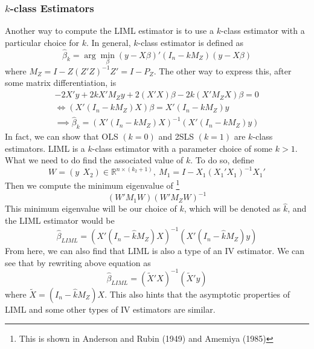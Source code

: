 \documentclass[12pt]{article}
\theoremstyle{definition}
\theoremstyle{property}
\theoremstyle{assumption}
\theoremstyle{example}
\theoremstyle{comment}
\begin{document}
\subsubsection{$k$-class Estimators}
Another way to compute the LIML estimator is to use a $k$-class estimator with a particular choice for $k$. In general, $k$-class estimator is defined as 
\[
\hat{\beta}_k=\arg\min_\beta(y-X\beta)'(I_n-kM_Z)(y-X\beta)
\]
where $M_Z = I-Z(Z'Z)^{-1}Z'=I-P_Z$. The other way to express this, after some matrix differentiation, is 
\begin{gather*}
-2X'y+2kX'M_Zy+2(X'X)\beta-2k(X'M_ZX)\beta=0\\
\iff (X'(I_n-kM_Z)X)\beta=X'(I_n-kM_Z)y\\
\implies \hat{\beta}_k= (X'(I_n-kM_Z)X)^{-1}(X'(I_n-kM_Z)y)
\end{gather*}
In fact, we can show that OLS $(k=0)$ and 2SLS $(k=1)$ are $k$-class estimators. LIML is a $k$-class estimator with a parameter choice of some $k>1$. What we need to do find the associated value of $k$. To do so, define
\[
W=(y\ \ X_2)\in \mathbb{R}^{n\times (k_2+1)}, \ M_1 = I- X_1(X_1'X_1)^{-1}X_1'
\]
Then we compute the minimum eigenvalue of \footnote{This is shown in Anderson and Rubin (1949) and Amemiya (1985)}
\[
(W'M_1W)(W'M_ZW)^{-1}
\]
This minimum eigenvalue will be our choice of $k$, which will be denoted as $\hat{k}$, and the LIML estimator would be
\[
\hat{\beta}_{LIML}=(X'(I_n-\hat{k}M_Z)X)^{-1}(X'(I_n-\hat{k}M_Z)y)
\]
From here, we can also find that LIML is also a type of an IV estimator. We can see that by rewriting above equation as
\[
\hat{\beta}_{LIML}=(\tilde{X}'X)^{-1}(\tilde{X}'y)
\]
where $\tilde{X}=(I_n-\hat{k}M_Z)X$. This also hints that the asymptotic properties of LIML and some other types of IV estimators are similar. 
\end{document}
